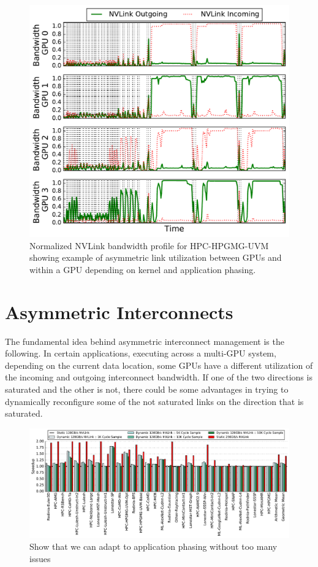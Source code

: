\begin{figure}[t]
    \centering
    \includegraphics[width=1.0\columnwidth]{figures/bw_profile_HPGMG_UVM_base.pdf}
    \caption{Normalized NVLink bandwidth profile for HPC-HPGMG-UVM showing example of asymmetric 
    link utilization between GPUs and within a GPU depending on kernel and application phasing.}
    \label{fig:link-motivation}
\end{figure}

\section{Asymmetric Interconnects}
\label{interconnect}

The fundamental idea behind asymmetric interconnect management is the following.
In certain applications, executing across a multi-GPU system, 
depending on the current data location, some GPUs have a different utilization 
of the incoming and outgoing interconnect bandwidth. If one of the two directions
is saturated and the other is not, there could be some advantages in trying to 
dynamically reconfigure some of the not saturated links on the direction 
that is saturated.

\begin{figure}[tp]
    \centering
    \includegraphics[width=1.0\textwidth]{figures/plot_nvlink_sample_time.pdf}
    \caption{Show that we can adapt to application phasing without too many 
issues}
    \label{fig:sampletime}
\end{figure}

